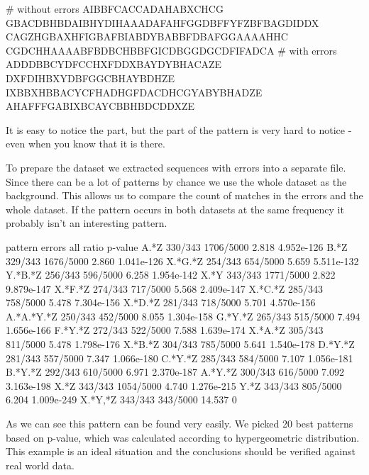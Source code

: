 \begin{file}
# without errors
AIBBFCACCADAHABXCHCG
GBACDBHBDAIBHYDIHAAADAFAHFGGDBFFYFZBFBAGDIDDX
CAGZHGBAXHFIGBAFBIABDYBABBFDBAFGGAAAAHHC
CGDCHHAAAABFBDBCHBBFGICDBGGDGCDFIFADCA
# with errors
ADDDBBCYDFCCHXFDDXBAYDYBHACAZE
DXFDIHBXYDBFGGCBHAYBDHZE
IXBBXHBBACYCFHADHGFDACDHCGYABYBHADZE
AHAFFFGABIXBCAYCBBHBDCDDXZE
\end{file}

It is easy to notice the  part, but the  part of the pattern is very hard to notice - even when you know that it is there. 

To prepare the dataset we extracted sequences with errors into a separate file. Since there can be a lot of patterns by chance we use the whole dataset as the background. This allows us to compare the count of matches in the errors and the whole dataset. If the pattern occurs in both datasets at the same frequency it probably isn't an interesting pattern.

\begin{file}
pattern      errors      all            ratio      p-value
A.*Z         330/343     1706/5000      2.818      4.952e-126
B.*Z         329/343     1676/5000      2.860      1.041e-126
X.*G.*Z      254/343     654/5000       5.659      5.511e-132
Y.*B.*Z      256/343     596/5000       6.258      1.954e-142
X.*Y         343/343     1771/5000      2.822      9.879e-147
X.*F.*Z      274/343     717/5000       5.568      2.409e-147
X.*C.*Z      285/343     758/5000       5.478      7.304e-156
X.*D.*Z      281/343     718/5000       5.701      4.570e-156
A.*A.*Y.*Z   250/343     452/5000       8.055      1.304e-158
G.*Y.*Z      265/343     515/5000       7.494      1.656e-166
F.*Y.*Z      272/343     522/5000       7.588      1.639e-174
X.*A.*Z      305/343     811/5000       5.478      1.798e-176
X.*B.*Z      304/343     785/5000       5.641      1.540e-178
D.*Y.*Z      281/343     557/5000       7.347      1.066e-180
C.*Y.*Z      285/343     584/5000       7.107      1.056e-181
B.*Y.*Z      292/343     610/5000       6.971      2.370e-187
A.*Y.*Z      300/343     616/5000       7.092      3.163e-198
X.*Z         343/343     1054/5000      4.740      1.276e-215
Y.*Z         343/343     805/5000       6.204      1.009e-249
X.*Y,*Z      343/343     343/5000       14.537     0
\end{file}

As we can see this  pattern can be found very easily. We picked 20 best patterns based on p-value, which was calculated according to hypergeometric distribution. This example is an ideal situation and the conclusions should be verified against real world data.

